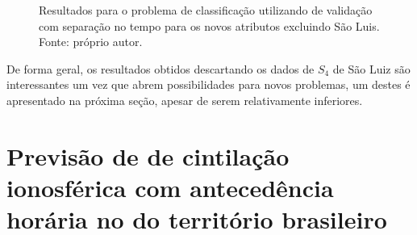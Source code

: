 \begin{figure}[H]
\center
\hspace{-2cm}
\caption{Resultados para o problema de classificação utilizando de validação com separação no tempo para os novos atributos excluindo São Luis. Fonte: próprio autor.}
\label{fig:classv1wmii}
\end{figure}

De forma geral, os resultados obtidos descartando os dados de $S_4$ de São Luiz são interessantes um vez que abrem possibilidades para novos problemas, um destes é apresentado na próxima seção, apesar de serem relativamente inferiores.


\section{Previsão de de cintilação ionosférica com antecedência horária no do território brasileiro}\label{sec:bra}

